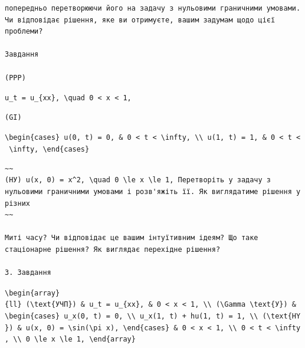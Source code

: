\documentclass[
  ukrainian,
]{article}
\begin{document}
\begin{verbatim}
попередньо перетворюючи його на задачу з нульовими граничними умовами. Чи відповідає рішення, яке ви отримуєте, вашим задумам щодо цієї проблеми?

Завдання

(PPP)
\end{verbatim}

\texttt{u\_t\ =\ u\_\{xx\},\ \textbackslash{}quad\ 0\ \textless{}\ x\ \textless{}\ 1,}

\begin{verbatim}
(GI)
\end{verbatim}

\texttt{\textbackslash{}begin\{cases\}\ u(0,\ t)\ =\ 0,\ \&\ 0\ \textless{}\ t\ \textless{}\ \textbackslash{}infty,\ \textbackslash{}\textbackslash{}\ u(1,\ t)\ =\ 1,\ \&\ 0\ \textless{}\ t\ \textless{}\ \textbackslash{}infty,\ \textbackslash{}end\{cases\}}

\begin{verbatim}
~~
(НУ) u(x, 0) = x^2, \quad 0 \le x \le 1, Перетворіть у задачу з нульовими граничними умовами і розв'яжіть її. Як виглядатиме рішення у різних
~~

Миті часу? Чи відповідає це вашим інтуїтивним ідеям? Що таке стаціонарне рішення? Як виглядає перехідне рішення?

3. Завдання
\end{verbatim}

\texttt{\textbackslash{}begin\{array\}\{ll\}\ (\textbackslash{}text\{УЧП\})\ \&\ u\_t\ =\ u\_\{xx\},\ \&\ 0\ \textless{}\ x\ \textless{}\ 1,\ \textbackslash{}\textbackslash{}\ (\textbackslash{}Gamma\ \textbackslash{}text\{У\})\ \&\ \textbackslash{}begin\{cases\}\ u\_x(0,\ t)\ =\ 0,\ \textbackslash{}\textbackslash{}\ u\_x(1,\ t)\ +\ hu(1,\ t)\ =\ 1,\ \textbackslash{}\textbackslash{}\ (\textbackslash{}text\{HY\})\ \&\ u(x,\ 0)\ =\ \textbackslash{}sin(\textbackslash{}pi\ x),\ \textbackslash{}end\{cases\}\ \&\ 0\ \textless{}\ x\ \textless{}\ 1,\ \textbackslash{}\textbackslash{}\ 0\ \textless{}\ t\ \textless{}\ \textbackslash{}infty,\ \textbackslash{}\textbackslash{}\ 0\ \textbackslash{}le\ x\ \textbackslash{}le\ 1,\ \textbackslash{}end\{array\}}
\end{document}

